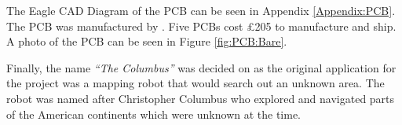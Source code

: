 The Eagle CAD Diagram of the PCB can be seen in Appendix \ref{Appendix:PCB}. The PCB was manufactured by \cite{PCBCart}. Five PCBs cost \pounds 205 to manufacture and ship. A photo of the PCB can be seen in Figure \ref{fig:PCB:Bare}. 

Finally, the name \textit{``The Columbus''} was decided on as the original application for the project was a mapping robot that would search out an unknown area. The robot was named after Christopher Columbus who explored and navigated parts of the American continents which were unknown at the time. 

\begin{figure}
\centering
{}

\end{figure}
